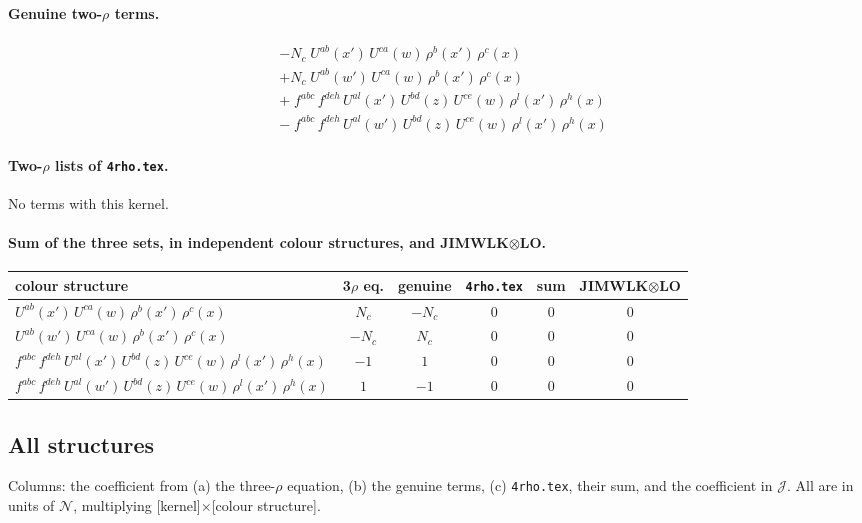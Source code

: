 \documentclass[10pt]{article}
\numberwithin{equation}{section}
\newcommand{\NN}{\mathcal N}
\newcommand{\J}{\mathcal J}
\begin{document}
\paragraph{Genuine two-$\rho$ terms.}
\begin{align*}
&-N_c\;U^{ab}(x')\,U^{ca}(w)\,\rho^{b}(x')\,\rho^{c}(x)\\&+N_c\;U^{ab}(w')\,U^{ca}(w)\,\rho^{b}(x')\,\rho^{c}(x)\\&+\;f^{abc}\,f^{deh}\,U^{al}(x')\,U^{bd}(z)\,U^{ce}(w)\,\rho^{l}(x')\,\rho^{h}(x)\\&-\;f^{abc}\,f^{deh}\,U^{al}(w')\,U^{bd}(z)\,U^{ce}(w)\,\rho^{l}(x')\,\rho^{h}(x)
\end{align*}
\paragraph{Two-$\rho$ lists of \texttt{4rho.tex}.}
No terms with this kernel.
\paragraph{Sum of the three sets, in independent colour structures, and JIMWLK$\otimes$LO.}
\begin{center}\small\begin{tabular}{@{}l c c c c c@{}}
colour structure & 3$\rho$ eq. & genuine & \texttt{4rho.tex} & sum & JIMWLK$\otimes$LO\\ \hline
$U^{ab}(x')\,U^{ca}(w)\,\rho^{b}(x')\,\rho^{c}(x)$ & $N_c$ & $- N_c$ & $0$ & $0$ & $0$\\
$U^{ab}(w')\,U^{ca}(w)\,\rho^{b}(x')\,\rho^{c}(x)$ & $- N_c$ & $N_c$ & $0$ & $0$ & $0$\\
$f^{abc}\,f^{deh}\,U^{al}(x')\,U^{bd}(z)\,U^{ce}(w)\,\rho^{l}(x')\,\rho^{h}(x)$ & $-1$ & $1$ & $0$ & $0$ & $0$\\
$f^{abc}\,f^{deh}\,U^{al}(w')\,U^{bd}(z)\,U^{ce}(w)\,\rho^{l}(x')\,\rho^{h}(x)$ & $1$ & $-1$ & $0$ & $0$ & $0$\\
\end{tabular}\end{center}

\subsection{All structures}
Columns: the coefficient from (a) the three-$\rho$ equation, (b) the genuine terms, (c) \texttt{4rho.tex}, their sum, and the coefficient in $\J$. All are in units of $\NN$, multiplying [kernel]$\times$[colour structure].
\end{document}
